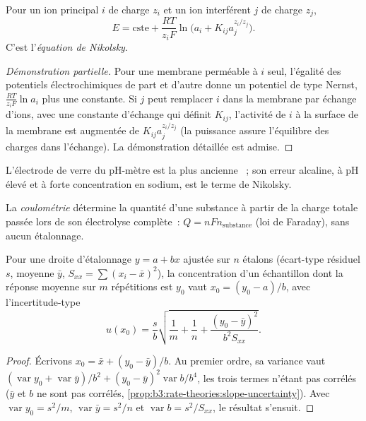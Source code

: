 \begin{proposition}\label{prop:b3:electrode-kinetics:nikolsky}
Pour un ion principal $i$ de charge $z_i$ et un ion interférent $j$ de
charge $z_j$,
\[
  E = \text{cste} + \frac{RT}{z_iF}\ln\bigl(a_i + K_{ij}a_j^{z_i/z_j}\bigr) .
\]
C'est l'\emph{équation de Nikolsky}.
\end{proposition}

\begin{proof}[Démonstration partielle]
Pour une membrane perméable à $i$ seul, l'égalité des potentiels
électrochimiques de part et d'autre donne un potentiel de type Nernst,
$\frac{RT}{z_iF}\ln a_i$ plus une constante.
Si $j$ peut remplacer $i$ dans la membrane par échange d'ions, avec une
constante d'échange qui définit $K_{ij}$, l'activité de $i$ à la surface
de la membrane est augmentée de
$K_{ij}a_j^{z_i/z_j}$ (la puissance assure l'équilibre des charges dans
l'échange). La démonstration détaillée est admise.
\end{proof}

L'électrode de verre du pH-mètre est la plus ancienne ~; son erreur alcaline, à pH élevé et à forte concentration en
sodium, est le terme de Nikolsky.

\begin{definition}[Coulométrie]\label{def:b3:electrode-kinetics:coulometry}
La \emph{coulométrie} détermine la quantité
d'une substance à partir de la charge totale passée lors de son
électrolyse complète~: $Q = nFn_{\text{substance}}$ (loi de
Faraday), sans aucun étalonnage.
\end{definition}

\begin{proposition}\label{prop:b3:electrode-kinetics:inverse-prediction}
Pour une droite d'étalonnage $y = a + bx$ ajustée sur $n$ étalons
(écart-type résiduel
$s$, moyenne $\bar y$, $S_{xx} = \sum(x_i - \bar x)^2$), la concentration
d'un échantillon dont la réponse moyenne sur $m$ répétitions est $y_0$
vaut $x_0 = (y_0 - a)/b$, avec l'incertitude-type
\[
  u(x_0) = \frac{s}{b}\sqrt{\frac1m + \frac1n + \frac{(y_0 - \bar y)^2}{b^2S_{xx}}} .
\]
\end{proposition}

\begin{proof}
Écrivons $x_0 = \bar x + (y_0 - \bar y)/b$. Au premier ordre, sa variance vaut $(\operatorname{var}y_0 +
\operatorname{var}\bar y)/b^2 + (y_0 - \bar y)^2\operatorname{var}b/b^4$,
les trois termes n'étant pas corrélés ($\bar y$ et $b$
ne sont pas corrélés, \cref{prop:b3:rate-theories:slope-uncertainty}). Avec $\operatorname{var}y_0 =
s^2/m$, $\operatorname{var}\bar y = s^2/n$ et $\operatorname{var}b = s^2/S_{xx}$,
le résultat s'ensuit.
\end{proof}

